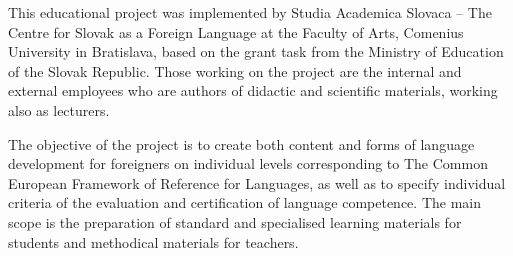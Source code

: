 This educational project was implemented by Studia Academica Slovaca – The Centre for Slovak as a Foreign Language at the Faculty of Arts, Comenius University in Bratislava, based on the grant task from the Ministry of Education of the Slovak Republic. Those working on the project are the internal and external employees who are authors of didactic and scientific materials, working also as lecturers.

The objective of the project is to create both content and forms of language development for foreigners on individual levels corresponding to The Common European Framework of Reference for Languages, as well as to specify individual criteria of the evaluation and certification of language competence. The main scope is the preparation of standard and specialised learning materials for students and methodical materials for teachers.
